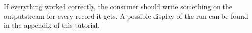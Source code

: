 \setBashListing 		
		

If everything worked correctly, the consumer should write something on the outputstream for every record it gets. A possible display of the run can be found in the appendix of this tutorial. 
